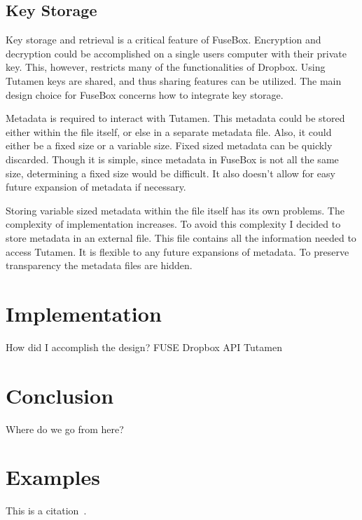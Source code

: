 \documentclass[11pt,twocolumn,letterpaper]{article}
\newcommand{\appname}{FuseBox }
\newcommand{\appnameWOspace}{FuseBox}
\newcommand{\custos}{Tutamen }
\newcommand{\custosWOspace}{Tutamen}
\begin{document}
\subsection{Key Storage}
\label{sec:keystorage}
Key storage and retrieval is a critical feature of \appnameWOspace. 
Encryption and decryption could be accomplished on a single users
computer with their private key. This, however, restricts many of the
functionalities of Dropbox. Using \custos keys are shared, and thus 
sharing features can be utilized. The main design choice for \appname
concerns how to integrate key storage.  
\par Metadata is required to interact with \custosWOspace. This
metadata could be stored either within the file itself, or else in a
separate metadata file. Also, it could either be a fixed size or a
variable size. Fixed sized metadata can be quickly discarded. Though
it is simple, since metadata in \appname is not all the same size,
determining a fixed size would be difficult. It also doesn't allow for
easy future expansion of metadata if necessary. 
\par Storing variable sized metadata within the file itself has its
own problems. The complexity of implementation increases. To avoid
this complexity I decided to store metadata in an external file. This
file contains all the information needed to access \custosWOspace. It
is flexible to any future expansions of metadata. 
To preserve transparency the metadata files are hidden. 

\section{Implementation}
\label{sec:implementation}

How did I accomplish the design?
FUSE
Dropbox API
\custos

\section{Conclusion}
\label{sec:conclusion}

Where do we go from here?

\section{Examples}
\label{sec:ex}

\noindent
This is a citation~\cite{exampleref1}.

\end{document}
